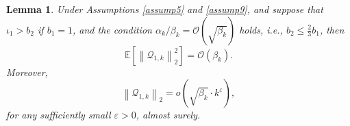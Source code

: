 \documentclass[aos]{imsart}
\numberwithin{equation}{section}
\theoremstyle{plain}
\newtheorem{lemma}{Lemma}
\begin{document}
\begin{appendix}
\begin{lemma}
\label{lemma27}
Under Assumptions \ref{assump5} and  \ref{assump9}, and suppose that $\iota_1>b_2$ if $b_1=1$, and the condition $\alpha_k / \beta_k = \mathcal{O} \left( \sqrt{\beta_k} \right)$ holds, i.e., $b_2 \leq \frac{2}{3} b_1$, then
    \begin{equation}
        \mathbb{E} \left[\left\| \mathcal{Q}_{1,k}\right\|_2^2 \right] = \mathcal{O} \left( \beta_k \right).
    \end{equation}
Moreover, 
\begin{equation}
        \left\| \mathcal{Q}_{1,k} \right\|_2 = o\left(\sqrt{\beta_k} \cdot k^{\varepsilon}  \right),
    \end{equation}
    for any sufficiently small $\varepsilon > 0$, almost surely. 
\end{lemma}



\end{appendix}
\end{document}
